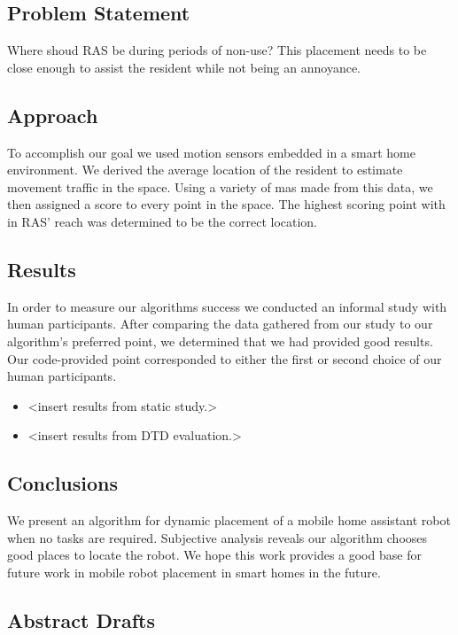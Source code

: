 \documentclass[11pt, conference, a4paper]{IEEEtran}
\begin{document}
\subsection{Problem Statement}
Where shoud RAS be during periods of non-use? This placement needs to be close enough to assist the resident while not being an annoyance. 


\subsection{Approach}
To accomplish our goal we used motion sensors embedded in a smart home environment. We derived the average location of the resident to estimate movement traffic in the space. Using a variety of mas made from this data, we then assigned a score to every point in the space. The highest scoring point with in RAS' reach was determined to be the correct location. 


\subsection{Results}
In order to measure our algorithms success we conducted an informal study with human participants. After comparing the data gathered from our study to our algorithm's preferred point, we determined that we had provided good results. Our code-provided point corresponded to either the first or second choice of our human participants.
\begin{itemize}
    \item \textless insert results from static study.\textgreater 
    \item \textless insert results from DTD evaluation.\textgreater
\end{itemize}



\subsection{Conclusions}
We present an algorithm for dynamic placement of a mobile home assistant robot 
when no tasks are required. Subjective analysis reveals our algorithm chooses 
good places to locate the robot. We hope this work provides a good base for 
future work in mobile robot placement in smart homes in the future.


\subsection{Abstract Drafts}
\end{document}
